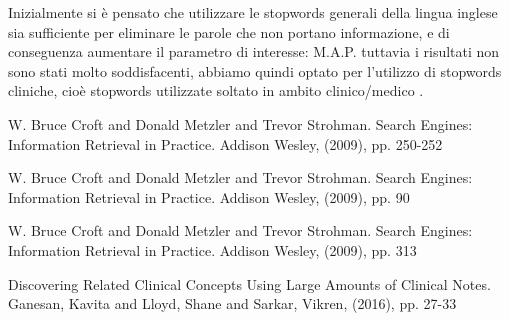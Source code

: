 \documentclass[runningheads]{llncs}
\begin{document}
Inizialmente si \`e pensato che utilizzare le stopwords generali della lingua inglese sia sufficiente per eliminare le 
parole che non portano informazione, e di conseguenza aumentare il parametro di interesse: M.A.P.  tuttavia i risultati
non sono stati molto soddisfacenti, abbiamo quindi optato per l'utilizzo di stopwords cliniche, cio\`e stopwords utilizzate 
soltato in ambito clinico/medico \cite{stopwords_cliniche}.

\begin{thebibliography}{8}

W. Bruce Croft and Donald Metzler and Trevor Strohman. Search Engines: Information Retrieval in Practice. Addison Wesley, (2009), pp. 250-252

W. Bruce Croft and Donald Metzler and Trevor Strohman. Search Engines: Information Retrieval in Practice. Addison Wesley, (2009), pp. 90

W. Bruce Croft and Donald Metzler and Trevor Strohman. Search Engines: Information Retrieval in Practice. Addison Wesley, (2009), pp. 313

Discovering Related Clinical Concepts Using Large Amounts of Clinical Notes. Ganesan, Kavita and Lloyd, Shane and Sarkar,
 Vikren, (2016), pp. 27-33

\end{thebibliography}

\begin{figure}[h!]
\end{figure}
\end{document}
